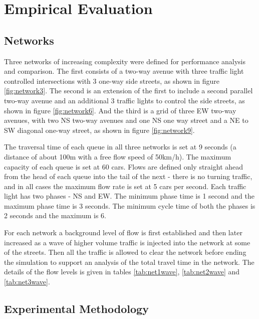 
\section{Empirical Evaluation}


\subsection{Networks}

Three networks of increasing complexity were defined for performance
analysis and comparison. The first consists of a two-way avenue with
three traffic light controlled intersections with 3 one-way side
streets, as shown in figure \ref{fig:network3}. The second is an
extension of the first to include a second parallel two-way avenue and
an additional 3 traffic lights to control the side streets, as shown
in figure \ref{fig:network6}. And the third is a grid of three EW
two-way avenues, with two NS two-way avenues and one NS one way street
and a NE to SW diagonal one-way street, as shown in figure
\ref{fig:network9}.

The traversal time of each queue in all three networks is set at 9
seconds (a distance of about 100m with a free flow speed of
50km/h). The maximum capacity of each queue is set at 60 cars. Flows
are defined only straight ahead from the head of each queue into the
tail of the next - there is no turning traffic, and in all cases the
maximum flow rate is set at 5 cars per second. Each traffic light has
two phases - NS and EW. The minimum phase time is 1 second and the
maximum phase time is 3 seconds. The minimum cycle time of both the
phases is 2 seconds and the maximum is 6.

For each network a background level of flow is first established and
then later increased as a wave of higher volume traffic is injected
into the network at some of the streets. Then all the traffic is
allowed to clear the network before ending the simulation to support
an analysis of the total travel time in the network. The details of
the flow levels is given in tables \ref{tab:net1wave},
\ref{tab:net2wave} and \ref{tab:net3wave}.

\subsection{Experimental Methodology}

